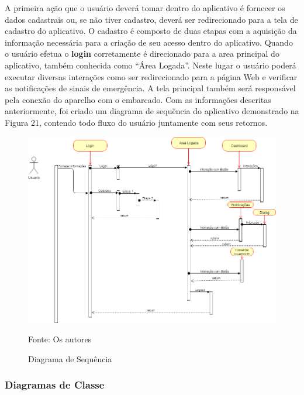 A primeira ação que o usuário deverá tomar dentro do aplicativo é fornecer os dados cadastrais ou, se não tiver cadastro, deverá ser redirecionado para a tela de cadastro do aplicativo. O cadastro é composto de duas etapas com a aquisição da informação necessária para a criação de seu acesso dentro do aplicativo.
Quando o usuário efetua o \textbf{login} corretamente é direcionado para a area principal do aplicativo, também conhecida como “Área Logada”. Neste lugar o usuário poderá executar diversas interações como ser redirecionado para a página Web e verificar as notificações de sinais de emergência. A tela principal também será responsável pela conexão do aparelho com o embarcado.
Com as informações descritas anteriormente, foi criado um diagrama de sequência do aplicativo demonstrado na Figura 21, contendo todo fluxo do usuário juntamente com seus retornos.


\begin{figure}[H]

 \caption{Diagrama de Sequência}
\begin{center}
  \includegraphics[width=150mm]{images/Cap3/Diagrama_de_Sequencia_Android.png}
  \end{center}
      Fonte: Os autores
    
\end{figure}

 






\subsubsection{Diagramas de Classe}

